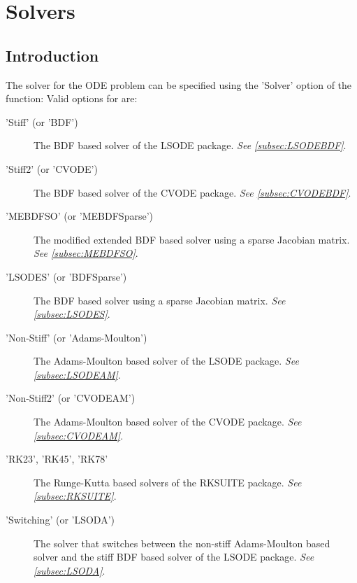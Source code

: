 \chapter{Solvers}
\section{Introduction}
The solver for the ODE problem can be specified using the 'Solver' option of the  function:
Valid options for  are:
\begin{description}
 \item['Stiff' (or 'BDF')] The BDF based solver of the LSODE package. \emph{See \ref{subsec:LSODEBDF}}.
 \item['Stiff2' (or 'CVODE')] The BDF based solver of the CVODE package. \emph{See \ref{subsec:CVODEBDF}}.
 \item['MEBDFSO' (or 'MEBDFSparse')] The modified extended BDF based solver using a sparse Jacobian matrix. \emph{See \ref{subsec:MEBDFSO}}.
 \item['LSODES' (or 'BDFSparse')] The BDF based solver using a sparse Jacobian matrix. \emph{See \ref{subsec:LSODES}}.
 \item['Non-Stiff' (or 'Adams-Moulton')] The Adams-Moulton based solver of the LSODE package. \emph{See \ref{subsec:LSODEAM}}.
 \item['Non-Stiff2' (or 'CVODEAM')] The Adams-Moulton based solver of the CVODE package. \emph{See \ref{subsec:CVODEAM}}.
 \item['RK23', 'RK45', 'RK78'] The Runge-Kutta based solvers of the RKSUITE package. \emph{See \ref{subsec:RKSUITE}}.
 \item['Switching' (or 'LSODA')] The solver that switches between the non-stiff Adams-Moulton based solver and the stiff BDF based solver of the LSODE package. \emph{See \ref{subsec:LSODA}}.
\end{description}

